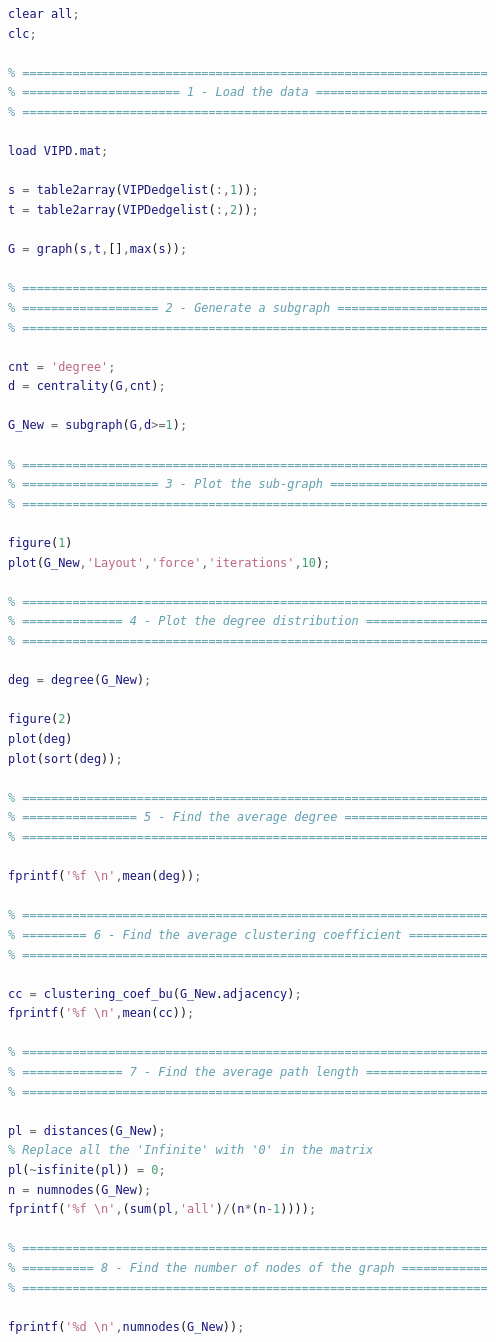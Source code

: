 \documentclass{article}
\begin{document}
    \begin{lstlisting}[language=Matlab]
clear all;
clc;

% =================================================================
% ====================== 1 - Load the data ========================
% =================================================================

load VIPD.mat;

s = table2array(VIPDedgelist(:,1));
t = table2array(VIPDedgelist(:,2));

G = graph(s,t,[],max(s));

% =================================================================
% =================== 2 - Generate a subgraph =====================
% =================================================================

cnt = 'degree';
d = centrality(G,cnt);

G_New = subgraph(G,d>=1);

% =================================================================
% =================== 3 - Plot the sub-graph ======================
% =================================================================

figure(1)
plot(G_New,'Layout','force','iterations',10);

% =================================================================
% ============== 4 - Plot the degree distribution =================
% =================================================================

deg = degree(G_New);

figure(2)
plot(deg)
plot(sort(deg));

% =================================================================
% ================ 5 - Find the average degree ====================
% =================================================================

fprintf('%f \n',mean(deg));

% =================================================================
% ========= 6 - Find the average clustering coefficient ===========
% =================================================================

cc = clustering_coef_bu(G_New.adjacency);
fprintf('%f \n',mean(cc));

% =================================================================
% ============== 7 - Find the average path length =================
% =================================================================

pl = distances(G_New);
% Replace all the 'Infinite' with '0' in the matrix
pl(~isfinite(pl)) = 0;
n = numnodes(G_New);
fprintf('%f \n',(sum(pl,'all')/(n*(n-1))));

% =================================================================
% ========== 8 - Find the number of nodes of the graph ============
% =================================================================

fprintf('%d \n',numnodes(G_New));
\end{lstlisting}
\end{document}
